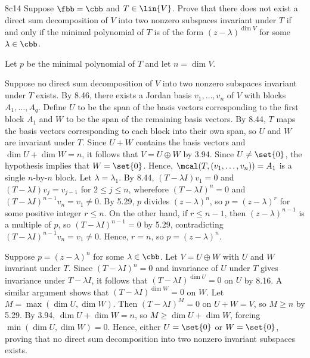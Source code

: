 \begin{exercise}{8c14}
    Suppose $\fbb = \cbb$ and $T \in \lin{V}$.
    Prove that there does not exist a direct sum decomposition of $V$ into two nonzero subspaces invariant under $T$ if and only if the minimal polynomial of $T$ is of the form $(z - \lambda)^{\dim V}$ for some $\lambda \in \cbb$.
\end{exercise}

\begin{sol}
    Let $p$ be the minimal polynomial of $T$ and let $n = \dim V$.

    \rightimp Suppose no direct sum decomposition of $V$ into two nonzero subspaces invariant under $T$ exists.
    By 8.46, there exists a Jordan basis $v_1, \ldots, v_n$ of $V$ with blocks $A_1, \ldots, A_q$.
    Define $U$ to be the span of the basis vectors corresponding to the first block $A_1$ and $W$ to be the span of the remaining basis vectors.
    By 8.44, $T$ maps the basis vectors corresponding to each block into their own span, so $U$ and $W$ are invariant under $T$.
    Since $U + W$ contains the basis vectors and $\dim U + \dim W = n$, it follows that $V = U \oplus W$ by 3.94.
    Since $U \neq \set{0}$, the hypothesis implies that $W = \set{0}$.
    Hence, $\mcal(T, (v_1, \ldots, v_n)) = A_1$ is a single $n$-by-$n$ block.
    Let $\lambda = \lambda_1$.
    By 8.44, $(T - \lambda I) v_1 = 0$ and $(T - \lambda I) v_j = v_{j-1}$ for $2 \leq j \leq n$, wherefore $(T - \lambda I)^n = 0$ and $(T - \lambda I)^{n-1} v_n = v_1 \neq 0$.
    By 5.29, $p$ divides $(z - \lambda)^n$, so $p = (z - \lambda)^r$ for some positive integer $r \leq n$.
    On the other hand, if $r \leq n-1$, then $(z - \lambda)^{n-1}$ is a multiple of $p$, so $(T - \lambda I)^{n-1} = 0$ by 5.29, contradicting $(T - \lambda I)^{n-1} v_n = v_1 \neq 0$.
    Hence, $r = n$, so $p = (z - \lambda)^n$.

    \leftimp Suppose $p = (z - \lambda)^n$ for some $\lambda \in \cbb$.
    Let $V = U \oplus W$ with $U$ and $W$ invariant under $T$.
    Since $(T - \lambda I)^n = 0$ and invariance of $U$ under $T$ gives invariance under $T - \lambda I$, it follows that $(T - \lambda I)^{\dim U} = 0$ on $U$ by 8.16.
    A similar argument shows that $(T - \lambda I)^{\dim W} = 0$ on $W$.
    Let $M = \max(\dim U, \dim W)$.
    Then $(T - \lambda I)^M = 0$ on $U + W = V$, so $M \geq n$ by 5.29.
    By 3.94, $\dim U + \dim W = n$, so $M \geq \dim U + \dim W$, forcing $\min(\dim U, \dim W) = 0$.
    Hence, either $U = \set{0}$ or $W = \set{0}$, proving that no direct sum decomposition into two nonzero invariant subspaces exists.
\end{sol}
